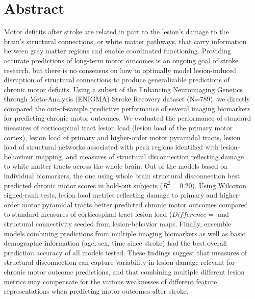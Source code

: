 \documentclass[10pt]{article}
\begin{document}
\section{Abstract}
 Motor deficits after stroke are related in part to the lesion's damage to the brain's structural connections, or white matter pathways, that carry information between gray matter regions and enable coordinated functioning. Providing accurate predictions of long-term motor outcomes  is an ongoing goal of stroke research, but there is no consensus on how to optimally model lesion-induced disruption of structural connections to produce generalizable predictions of chronic motor deficits. Using a subset of the Enhancing Neuroimaging Genetics through Meta-Analysis (ENIGMA) Stroke Recovery dataset (N=789), we directly compared the out-of-sample predictive performance of several imaging biomarkers for predicting chronic motor outcomes. We evaluated the performance of standard measures of corticospinal tract lesion load (lesion load of the primary motor cortex), lesion load of primary and higher-order motor pyramidal tracts, lesion load of structural networks associated with peak regions identified with lesion-behaviour mapping, and measures of structural disconnection reflecting damage to white matter tracts across the whole brain. Out of the models based on individual biomarkers, the one using whole brain structural disconnection best predicted chronic motor scores in hold-out subjects ($R^2 = 0.20$). Using Wilcoxon signed-rank tests, lesion load metrics reflecting damage to primary and higher-order motor pyramidal tracts better predicted chronic motor outcomes compared to standard measures of corticospinal tract lesion load ($Difference = $ and structural connectivity seeded from lesion-behavior maps. Finally, ensemble models combining predictions from multiple imaging biomarkers as well as basic demographic information (age, sex, time since stroke) had the best overall prediction accuracy of all models tested. These findings suggest that measures of structural disconnection can capture variability in lesion damage relevant for chronic motor outcome predictions, and that combining multiple different lesion metrics may compensate for the various weaknesses of different feature representations when predicting motor outcomes after stroke.
\end{document}
